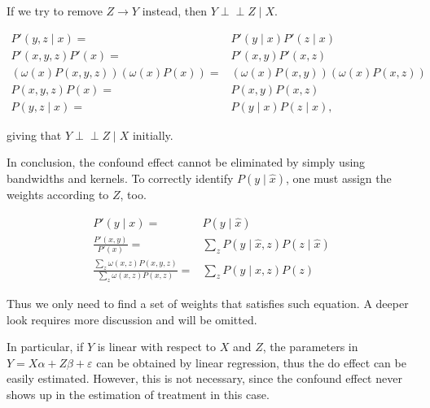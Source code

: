 \documentclass[a4 paper,12pt]{article}
\newcommand{\indep}{\perp \!\!\! \perp}
\begin{document}
If we try to remove $Z\to Y$ instead, then $Y\indep Z\mid X$.

\begin{align}
   P'(y,z\mid x)=&P'(y\mid x)P'(z\mid x)\\
   P'(x,y,z)P'(x)=&P'(x,y)P'(x,z)\\
   (\omega(x)P(x,y,z))(\omega(x)P(x))=&(\omega(x)P(x,y))(\omega(x)P(x,z))\\
   P(x,y,z)P(x)=&P(x,y)P(x,z)\\
   P(y,z\mid x)=&P(y\mid x)P(z\mid x),
\end{align}

giving that $Y\indep Z\mid X$ initially.

In conclusion, the confound effect cannot be eliminated by simply using bandwidths and kernels.
To correctly identify $P(y\mid\hat x)$,
one must assign the weights according to $Z$, too.

\begin{align}
   P'(y\mid x)=&P(y\mid \hat x)\\
   \frac{P'(x,y)}{P'(x)}=&\sum_z P(y\mid \hat x,z)P(z\mid \hat x)\\
   \frac{\sum_z \omega(x,z)P(x,y,z)}{\sum_z \omega(x,z)P(x,z)}=&\sum_z P(y\mid x,z)P(z)
\end{align}

Thus we only need to find a set of weights that satisfies such equation.
A deeper look requires more discussion and will be omitted.

In particular,
if $Y$ is linear with respect to $X$ and $Z$,
the parameters in $Y=X\alpha+Z\beta+\varepsilon$ can be obtained by linear regression,
thus the do effect can be easily estimated.
However, this is not necessary, since the confound effect never shows up in the estimation of treatment in this case.
\end{document}
